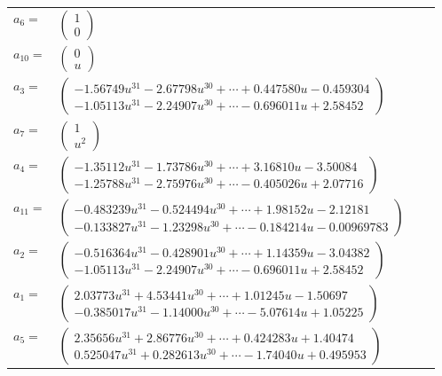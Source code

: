 \documentclass[1p]{elsarticle_modified}
\theoremstyle{definition}
\begin{document}
\begin{tabular}{m{7pt} m{180pt} m{7pt} m{180pt} }
\flushright $a_{6}=$&$\begin{pmatrix}1\\0\end{pmatrix}$ \\
\flushright $a_{10}=$&$\begin{pmatrix}0\\u\end{pmatrix}$ \\
\flushright $a_{3}=$&$\begin{pmatrix}-1.56749 u^{31}-2.67798 u^{30}+\cdots+0.447580 u-0.459304\\-1.05113 u^{31}-2.24907 u^{30}+\cdots-0.696011 u+2.58452\end{pmatrix}$ \\
\flushright $a_{7}=$&$\begin{pmatrix}1\\u^2\end{pmatrix}$ \\
\flushright $a_{4}=$&$\begin{pmatrix}-1.35112 u^{31}-1.73786 u^{30}+\cdots+3.16810 u-3.50084\\-1.25788 u^{31}-2.75976 u^{30}+\cdots-0.405026 u+2.07716\end{pmatrix}$ \\
\flushright $a_{11}=$&$\begin{pmatrix}-0.483239 u^{31}-0.524494 u^{30}+\cdots+1.98152 u-2.12181\\-0.133827 u^{31}-1.23298 u^{30}+\cdots-0.184214 u-0.00969783\end{pmatrix}$ \\
\flushright $a_{2}=$&$\begin{pmatrix}-0.516364 u^{31}-0.428901 u^{30}+\cdots+1.14359 u-3.04382\\-1.05113 u^{31}-2.24907 u^{30}+\cdots-0.696011 u+2.58452\end{pmatrix}$ \\
\flushright $a_{1}=$&$\begin{pmatrix}2.03773 u^{31}+4.53441 u^{30}+\cdots+1.01245 u-1.50697\\-0.385017 u^{31}-1.14000 u^{30}+\cdots-5.07614 u+1.05225\end{pmatrix}$ \\
\flushright $a_{5}=$&$\begin{pmatrix}2.35656 u^{31}+2.86776 u^{30}+\cdots+0.424283 u+1.40474\\0.525047 u^{31}+0.282613 u^{30}+\cdots-1.74040 u+0.495953\end{pmatrix}$ \\

\end{tabular}
\end{document}
